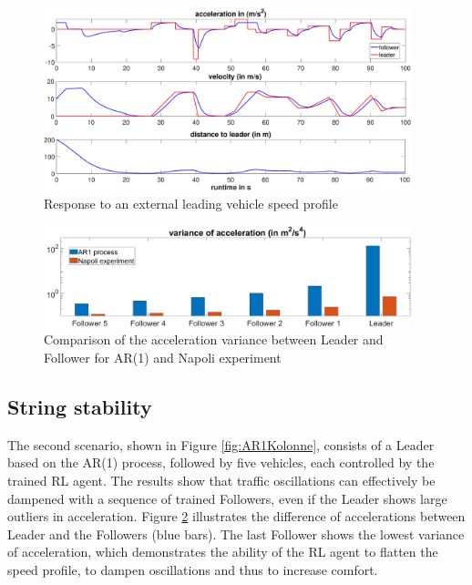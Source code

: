 \documentclass[review]{elsarticle}
\begin{document}
\begin{figure}
	\centering
	\includegraphics[width=0.95\textwidth]{images/manipulatedLeader.eps}
	\caption{Response to an external leading vehicle speed profile}
	\label{fig:manipulatedLeader}
\end{figure}

\begin{figure}
	\centering
	\includegraphics[width=0.95\textwidth]{images/VarAccComp}
	\caption{Comparison of the acceleration variance between Leader and Follower for AR(1) and Napoli experiment}
	\label{fig:VarAccComp}
\end{figure}






\subsection{String stability}
\label{sec:stringStability}
The second scenario, shown in Figure \ref{fig:AR1Kolonne}, consists of a Leader based on the AR(1) process, followed by five vehicles, each controlled by the trained RL agent. The results show that traffic oscillations can effectively be dampened with a sequence of trained Followers, even if the Leader shows large outliers in acceleration. Figure \ref{fig:VarAccComp} illustrates the difference of accelerations between Leader and the Followers (blue bars). The last Follower shows the lowest variance of acceleration, which demonstrates the ability of the RL agent to flatten the speed profile, to dampen oscillations and thus to increase comfort.  
\end{document}

